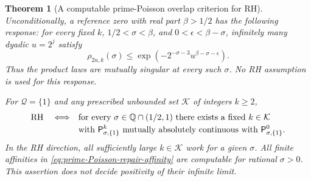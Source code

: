 \documentclass[11pt]{article}
\newtheorem{theorem}{Theorem}[section]
\theoremstyle{definition}
\begin{document}
\begin{theorem}[A computable prime-Poisson overlap criterion for RH]
Unconditionally, a reference zero with real part
$\beta>1/2$ has the following response: for every fixed $k$,
$1/2<\sigma<\beta$, and $0<\epsilon<\beta-\sigma$, infinitely
many dyadic $u=2^j$ satisfy
\begin{equation}
 \rho_{2u,k}(\sigma)
       \le\exp\left(-2^{-\sigma-3}
                         u^{\beta-\sigma-\epsilon}\right).
 \label{eq:prime-Poisson-bad-zero-response}
\end{equation}
Thus the product laws are mutually singular at every such
$\sigma$. No RH assumption is used for this response.

For $\mathcal Q=\{1\}$ and any prescribed unbounded set
$\mathcal K$ of integers $k\ge2$,
\begin{equation}
 \begin{aligned}
 {\rm RH}\quad\Longleftrightarrow\quad&
 \text{for every }\sigma\in\mathbb Q\cap(1/2,1)
 \text{ there exists a fixed }k\in\mathcal K\\[-2pt]
 &\text{with }\mathsf P^k_{\sigma,\{1\}}
          \text{ mutually absolutely continuous with }
                         \mathsf P^0_{\sigma,\{1\}}.
 \end{aligned}
 \label{eq:prime-Poisson-RH-criterion}
\end{equation}
In the RH direction, all sufficiently large $k\in\mathcal K$
work for a given $\sigma$. All finite affinities in
\eqref{eq:prime-Poisson-repair-affinity} are computable for
rational $\sigma>0$. This assertion does not decide positivity
of their infinite limit.
\end{theorem}
\end{document}
